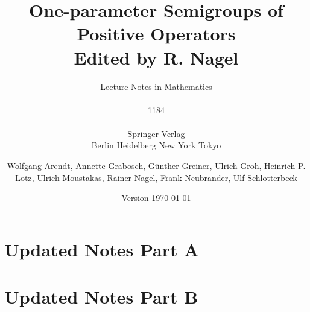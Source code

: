\documentclass[%
	,graybox
	,envcountsect			%
	]{svmono}
\date{\LARGE Version \today}
\begin{document}
\author{Wolfgang Arendt, Annette Grabosch, Günther Greiner, Ulrich Groh, Heinrich P. Lotz, Ulrich Moustakas, Rainer Nagel, Frank Neubrander, Ulf Schlotterbeck}
\title{One-parameter Semigroups of Positive Operators\\
		{\large{Edited by R. Nagel}}}
\subtitle{Lecture Notes in Mathematics\\ \\ 1184\\ \\Springer-Verlag\\ Berlin Heidelberg New York Tokyo}
\maketitle
\frontmatter%

%

%
\tableofcontents

\mainmatter%
%

 























{\RaggedRight

}

\cleardoublepage 
\printindex



\chapter{Updated Notes Part A}
	
\chapter{Updated Notes  Part B}
	
\end{document}
